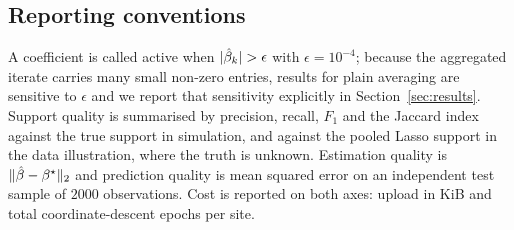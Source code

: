 \subsection{Reporting conventions}

A coefficient is called active when $|\hat{\beta}_k| > \epsilon$ with
$\epsilon = 10^{-4}$; because the aggregated iterate carries many
small non-zero entries, results for plain averaging are sensitive to
$\epsilon$ and we report that sensitivity explicitly in
Section~\ref{sec:results}. Support quality is summarised by precision,
recall, $F_1$ and the Jaccard index against the true support in simulation,
and against the pooled Lasso support in the data illustration, where the
truth is unknown. Estimation quality is $\|\hat{\beta} - \beta^\star\|_2$
and prediction quality is mean squared error on an independent test sample
of $2000$ observations. Cost is reported on both axes: upload in KiB and
total coordinate-descent epochs per site.
